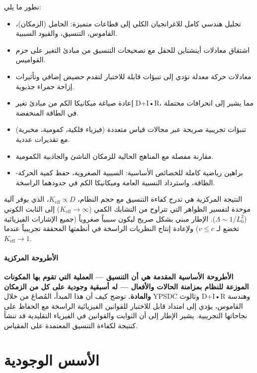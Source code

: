 \documentclass[11pt,a4paper]{article}
\begin{document}
	نطور ما يلي:
	\begin{itemize}
		\item تحليل هندسي كامل للاغرانجيان الكلي إلى قطاعات متميزة: الحامل (الزمكان)، القاموس، التنسيق، والقيود السببية.
		\item اشتقاق معادلات أينشتاين للحقل مع تصحيحات التنسيق من مبادئ التغير على حزم القواميس.
		\item معادلات حركة معدلة تؤدي إلى تنبؤات قابلة للاختبار لتقدم حضيض إضافي وتأثيرات إزاحة حمراء جذبوية.
		\item إعادة صياغة ميكانيكا الكم من مبادئ تغير D+I•R، مما يشير إلى انحرافات محتملة في الطاقة المنخفضة.
		\item تنبؤات تجريبية صريحة عبر مجالات قياس متعددة (فيزياء فلكية، كمومية، مخبرية) مع تقديرات عددية.
		\item مقارنة مفصلة مع المناهج الحالية للزمكان الناشئ والجاذبية الكمومية.
		\item براهين رياضية كاملة للخصائص الأساسية: السببية الصغروية، حفظ كمية الحركة-الطاقة، واسترداد النسبية العامة وميكانيكا الكم في حدودهما الراسخة.
	\end{itemize}
	
	النتيجة المركزية هي تدرج كفاءة التنسيق مع حجم النظام، $K_{\mathrm{eff}} \propto D$، الذي يوفر آلية موحدة لتفسير الظواهر التي تتراوح من التشابك الكمي ($K_{\mathrm{eff}} \to \infty$) إلى الثابت الكوني ($\Lambda \sim 1/L_0^2$). الإطار مبني بشكل صريح ليكون سببياً صغروياً (جميع الإشارات الفيزيائية تخضع لـ $v \leq c$) ولإعادة إنتاج النظريات الراسخة في أنظمتها المحققة تجريبياً عندما $K_{\mathrm{eff}} \to 1$.
	
	\paragraph{الأطروحة المركزية}
	\textbf{الأطروحة الأساسية المقدمة هي أن التنسيق — العملية التي تقوم بها المكونات الموزعة للنظام بمزامنة الحالات والأفعال — له أسبقية وجودية على كل من الزمكان والمادة.} نوضح كيف أن هذا المبدأ، المُصاغ من خلال YPSDC وثالوث D+I•R وهندسة القاموس، يؤدي إلى امتداد قابل للاختبار للقوانين الفيزيائية الراسخة مع الحفاظ على نجاحاتها التجريبية. يشير الإطار إلى أن الثوابت والقوانين في الفيزياء التقليدية قد تنشأ كنتيجة لكفاءة التنسيق المعتمدة على المقياس.
	
	\section{الأسس الوجودية}
	\label{sec:ontological-foundations}
	
\end{document}
